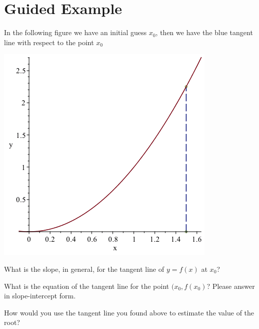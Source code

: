 \documentclass{ximera}
\begin{document}
\section{Guided Example}
In the following figure we have an initial guess $x_{0}$, then we have the blue tangent line with respect to the point $x_{0}$
\begin{image}
\includegraphics{NewtonMethod}
\end{image}
\begin{question}

What is the slope, in general, for the tangent line of $y=f(x)$ at $x_{0}$?

\begin{multipleChoice}
\end{multipleChoice}

What is the equation of the tangent line for the point $(x_{0},f(x_{0})$? Please answer in slope-intercept form.

\begin{multipleChoice}
\end{multipleChoice}

How would you use the tangent line you found above to estimate the value of the root?

\begin{multipleChoice}
\end{multipleChoice}

\end{question}
\end{document}
